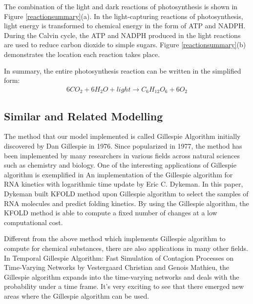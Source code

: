 \documentclass[12pt,reqno]{amsart}
\begin{document}
    The combination of the light and dark reactions of 
    photosynthesis is shown in Figure \ref{reactionsummary}(a). 
    In the light-capturing reactions of photosynthesis, light energy 
    is transformed to chemical energy in the form of ATP and NADPH. 
    During the Calvin cycle, the ATP and NADPH produced in 
    the light reactions are used to reduce carbon dioxide 
    to simple sugars. Figure \ref{reactionsummary}(b)
    demonstrates the location each reaction takes place.

    In summary, the entire photosynthesis reaction can be written 
    in the simplified form:    
    \begin{align}
        6CO_2 + 6H_2O + light \rightarrow C_6H_{12}O_6 + 6O_2
    \end{align}


    
    
    \newpage
    
    \subsection*{Similar and Related Modelling}

    The method that our model implemented is called Gillespie Algorithm 
    initially discovered by Dan Gillespie in 1976\cite{gillespie}. 
    Since popularized in 1977, the method has been implemented by many 
    researchers in various fields across natural sciences such as 
    chemistry and biology\cite{gillespie_wiki}. One of the interesting 
    applications of Gillespie algorithm is exemplified in 
    An implementation of the Gillespie algorithm for RNA kinetics with 
    logarithmic time update by Eric C. Dykeman\cite{dykeman}. 
    In this paper, Dykeman built KFOLD method upon Gillespie algorithm to 
    select the samples of RNA molecules and predict folding kinetics. 
    By using the Gillespie algorithm, the KFOLD method is able to 
    compute a fixed number of changes at a low computational cost.
    
    Different from the above method which implements Gillespie
    algorithm to compute for chemical substances, there are also
    applications in many other fields. In Temporal Gillespie Algorithm:
    Fast Simulation of Contagion Processes on Time-Varying Networks by
    Vestergaard Christian and Genois Mathieu\cite{vestergaard}, 
    the Gillespie algorithm expands into the time-varying networks 
    and deals with the probability under a time frame. It’s very 
    exciting to see that there emerged new areas where the Gillespie 
    algorithm can be used.
    
\end{document}
